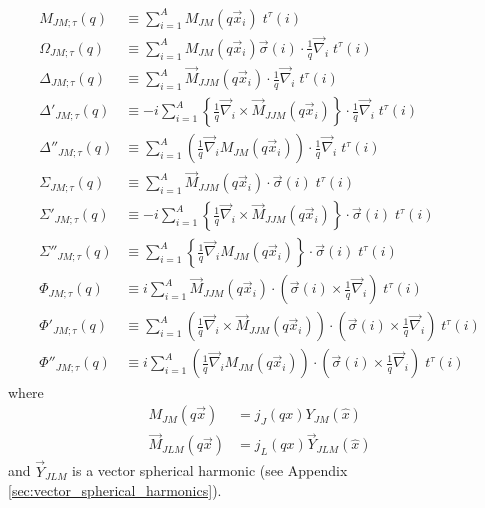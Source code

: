 \documentclass{book}[12pt]
\begin{document}
\begin{equation}
\begin{split}
M_{JM;\tau}(q)&\equiv \sum_{i=1}^AM_{JM}(q\vec{x}_i)\;t^{\tau}(i)\\
\Omega_{JM;\tau}(q)&\equiv \sum_{i=1}^AM_{JM}(q\vec{x}_i)\vec{\sigma}(i)\cdot\frac{1}{q}\vec{\nabla}_i\;t^{\tau}(i)\\
\Delta_{JM;\tau}(q)&\equiv \sum_{i=1}^A \vec{M}_{JJM}(q\vec{x}_i)\cdot\frac{1}{q}\vec{\nabla}_i\;t^{\tau}(i)\\
\Delta'_{JM;\tau}(q)&\equiv -i\sum_{i=1}^A \left\{\frac{1}{q}\vec{\nabla}_i\times\vec{M}_{JJM}(q\vec{x}_i)\right\}\cdot\frac{1}{q}\vec{\nabla}_i\;t^{\tau}(i)\\
\Delta''_{JM;\tau}(q)&\equiv \sum_{i=1}^A\left(\frac{1}{q}\vec{\nabla}_iM_{JM}(q\vec{x}_i)\right)\cdot\frac{1}{q}\vec{\nabla}_i\;t^{\tau}(i)\\
\Sigma_{JM;\tau}(q)&\equiv \sum_{i=1}^A\vec{M}_{JJM}(q\vec{x}_i)\cdot\vec{\sigma}(i)\;t^{\tau}(i)\\
\Sigma'_{JM;\tau}(q)&\equiv -i\sum_{i=1}^A\left\{\frac{1}{q}\vec{\nabla}_i\times\vec{M}_{JJM}(q\vec{x}_i)\right\}\cdot\vec{\sigma}(i)\;t^{\tau}(i)\\
\Sigma''_{JM;\tau}(q)&\equiv \sum_{i=1}^A\left\{\frac{1}{q}\vec{\nabla}_iM_{JM}(q\vec{x}_i)\right\}\cdot\vec{\sigma}(i)\;t^{\tau}(i)\\
\Phi_{JM;\tau}(q)&\equiv i\sum_{i=1}^A\vec{M}_{JJM}(q\vec{x}_i)\cdot\left(\vec{\sigma}(i)\times\frac{1}{q}\vec{\nabla}_i\right)\;t^{\tau}(i)\\
\Phi'_{JM;\tau}(q)&\equiv\sum_{i=1}^A\left(\frac{1}{q}\vec{\nabla}_i\times\vec{M}_{JJM}(q\vec{x}_i)\right)\cdot\left(\vec{\sigma}(i)\times\frac{1}{q}\vec{\nabla}_i\right)\;t^{\tau}(i)\\
\Phi''_{JM;\tau}(q)&\equiv i\sum_{i=1}^A\left(\frac{1}{q}\vec{\nabla}_iM_{JM}(q\vec{x}_i)\right)\cdot\left(\vec{\sigma}(i)\times\frac{1}{q}\vec{\nabla}_i\right)\;t^{\tau}(i)
\label{eq:single_nucleon_responses}
\end{split}
\end{equation}
where 
\begin{equation}
\begin{split}
M_{JM}(q\vec{x})&=j_J(qx)Y_{JM}(\hat{x})\\
\vec{M}_{JLM}(q\vec{x})&=j_L(qx)\vec{Y}_{JLM}(\hat{x})
\end{split}
\end{equation}
and $\vec{Y}_{JLM}$ is a vector spherical harmonic (see Appendix \ref{sec:vector_spherical_harmonics}). 
\end{document}
